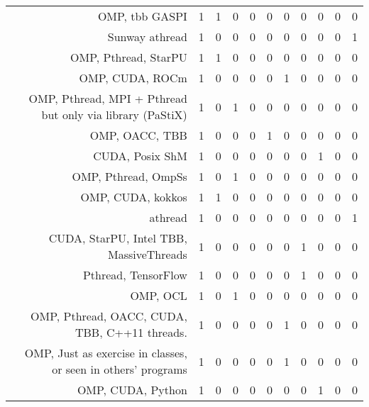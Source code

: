 {\begin{landscape}
\begin{longtable}[htb]{r|c|c|c|c|c|c|c|c|c|c}
{OMP, tbb GASPI} & 1 & 1 & 0 & 0 & 0 & 0 & 0 & 0 & 0 & 0 \\%
{Sunway athread} & 1 & 0 & 0 & 0 & 0 & 0 & 0 & 0 & 0 & 1 \\%
{OMP, Pthread, StarPU} & 1 & 1 & 0 & 0 & 0 & 0 & 0 & 0 & 0 & 0 \\%
{OMP, CUDA, ROCm} & 1 & 0 & 0 & 0 & 0 & 1 & 0 & 0 & 0 & 0 \\%
{OMP, Pthread, MPI + Pthread but only via library (PaStiX)} & 1 & 0 & 1 & 0 & 0 & 0 & 0 & 0 & 0 & 0 \\%
{OMP, OACC, TBB} & 1 & 0 & 0 & 0 & 1 & 0 & 0 & 0 & 0 & 0 \\%
{CUDA, Posix ShM} & 1 & 0 & 0 & 0 & 0 & 0 & 0 & 1 & 0 & 0 \\%
{OMP, Pthread, OmpSs} & 1 & 0 & 1 & 0 & 0 & 0 & 0 & 0 & 0 & 0 \\%
{OMP, CUDA, kokkos} & 1 & 1 & 0 & 0 & 0 & 0 & 0 & 0 & 0 & 0 \\%
{athread} & 1 & 0 & 0 & 0 & 0 & 0 & 0 & 0 & 0 & 1 \\%
{CUDA, StarPU, Intel TBB, MassiveThreads} & 1 & 0 & 0 & 0 & 0 & 0 & 1 & 0 & 0 & 0 \\%
{Pthread, TensorFlow} & 1 & 0 & 0 & 0 & 0 & 0 & 1 & 0 & 0 & 0 \\%
{OMP, OCL} & 1 & 0 & 1 & 0 & 0 & 0 & 0 & 0 & 0 & 0 \\%
{OMP, Pthread, OACC, CUDA, TBB, C++11 threads.} & 1 & 0 & 0 & 0 & 0 & 1 & 0 & 0 & 0 & 0 \\%
{OMP, Just as exercise in classes, or seen in others' programs} & 1 & 0 & 0 & 0 & 0 & 1 & 0 & 0 & 0 & 0 \\%
{OMP, CUDA, Python} & 1 & 0 & 0 & 0 & 0 & 0 & 0 & 1 & 0 & 0 \\%
\hline%
\end{longtable}%
\end{landscape}}%
\clearpage%

